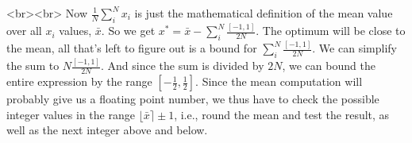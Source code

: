 <br><br>
Now $\frac{1}{N}\sum_i^N x_i$ is just the mathematical definition of the mean value over all $x_i$ values, $\bar{x}$. So we get $x^\ast = \bar{x} - \sum_i^N \frac{[-1,1]}{2N}$. The optimum will be close to the mean, all that's left to figure out is a bound for $\sum_i^N \frac{[-1,1]}{2N}$. We can simplify the sum to $N\frac{[-1,1]}{2N}$. And since the sum is divided by $2N$, we can bound the entire expression by the range $[-\frac{1}{2},\frac{1}{2}]$. Since the mean computation will probably give us a floating point number, we thus have to check the possible integer values in the range $\lfloor \bar{x} \rceil \pm 1$, i.e., round the mean and test the result, as well as the next integer above and below.
